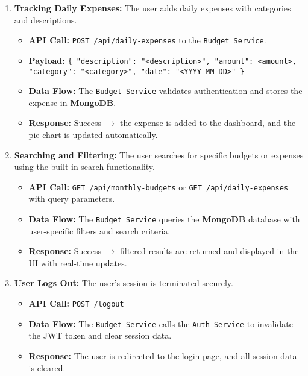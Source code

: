 \documentclass[conference]{IEEEtran}
\begin{document}
\begin{enumerate}
  \item \textbf{Tracking Daily Expenses:}
  The user adds daily expenses with categories and descriptions.
  \begin{itemize}
    \item \textbf{API Call:} \texttt{POST /api/daily-expenses} to the \texttt{Budget Service}.
    \item \textbf{Payload:} \texttt{\{ "description": "<description>", "amount": <amount>, "category": "<category>", "date": "<YYYY-MM-DD>" \}}
    \item \textbf{Data Flow:} The \texttt{Budget Service} validates authentication and stores the expense in \textbf{MongoDB}.
    \item \textbf{Response:} Success $\rightarrow$ the expense is added to the dashboard, and the pie chart is updated automatically.
  \end{itemize}

  \item \textbf{Searching and Filtering:}
  The user searches for specific budgets or expenses using the built-in search functionality.
  \begin{itemize}
    \item \textbf{API Call:} \texttt{GET /api/monthly-budgets} or \texttt{GET /api/daily-expenses} with query parameters.
    \item \textbf{Data Flow:} The \texttt{Budget Service} queries the \textbf{MongoDB} database with user-specific filters and search criteria.
    \item \textbf{Response:} Success $\rightarrow$ filtered results are returned and displayed in the UI with real-time updates.
  \end{itemize}

  \item \textbf{User Logs Out:}
  The user's session is terminated securely.
  \begin{itemize}
    \item \textbf{API Call:} \texttt{POST /logout}
    \item \textbf{Data Flow:} The \texttt{Budget Service} calls the \texttt{Auth Service} to invalidate the JWT token and clear session data.
    \item \textbf{Response:} The user is redirected to the login page, and all session data is cleared.
  \end{itemize}
\end{enumerate}

\end{document}
